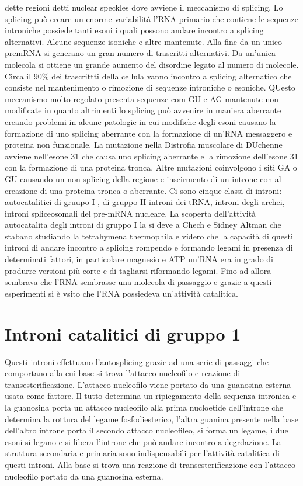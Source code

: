 dette regioni detti nuclear speckles dove avviene il meccanismo di splicing. Lo splicing pu\`o creare un enorme variabilit\`a l'RNA primario che contiene le sequenze introniche possiede
tanti esoni i quali possono andare incontro a splicing alternativi. Alcune sequenze isoniche e altre mantenute. Alla fine da un unico premRNA si generano un gran numero di trascritti
alternativi. Da un'unica molecola si ottiene un grande aumento del disordine legato al numero di molecole. Circa il $90\%$ dei trascrittti della cellula vanno incontro a splicing 
alternatico che consiste nel mantenimento o rimozione di sequenze introniche o esoniche. QUesto meccanismo molto regolato presenta sequenze com GU e AG mantenute non modificate in quanto
altrimenti lo splicing pu\`o avvenire in maniera aberrante creando problemi in alcune patologie in cui modifiche degli esoni causano la formazione di uno splicing aberrante con la 
formazione di un'RNA messaggero e proteina non funzionale. La mutazione nella Distrofia muscolare di DUchenne avviene nell'esone 31 che causa uno splicing aberrante e la rimozione 
dell'esone 31 con la formazione di una proteina tronca. Altre mutazioni coinvolgono i siti GA o GU causando un non splicing della regione e inseirmento di un introne con al creazione
di una proteina tronca o aberrante. Ci sono cinque classi di introni: autocatalitici di gruupo I , di gruppo II introni dei tRNA, introni degli archei, introni spliceosomali del pre-mRNA 
nucleare. La scoperta dell'attivit\`a autocatalita degli introni di gruppo I la si deve a Chech e Sidney Altman che stabano studiando la tetrahymena thermophila e videro che la capacit\`a
di questi introni di andare incontro a splicing rompendo e formando legami in presenza di determinati fattori, in particolare magnesio e ATP un'RNA era in grado di produrre versioni
pi\`u corte e di tagliarsi riformando legami. Fino ad allora sembrava che l'RNA sembrasse una molecola di passaggio e grazie a questi esperimenti si \`e vsito che l'RNA possiedeva 
un'attivit\`a catalitica.
\section{Introni catalitici di gruppo 1}
Questi introni effettuano l'autosplicing grazie ad una serie di passaggi che comportano alla cui base si trova l'attacco nucleofilo e reazione di transesterificazione. L'attacco 
nucleofilo viene portato da una guanosina esterna usata come fattore. Il tutto determina un ripiegamento della sequenza intronica e la guanosina porta un attacco nucleofilo alla prima
nucloetide dell'introne che determina la rottura del legame fosfodiesterico, l'altra guanina presente nella base dell'altro introne porta il secondo attacco nucleofileo, si forma un 
legame, i due esoni si legano e si libera l'introne che pu\`o andare incontro a degrdazione. La struttura secondaria e primaria sono indispensabili per l'attivit\`a catalitica di questi
introni. Alla base si trova una reazione di transesterificazione con l'attacco nucleofilo portato da una guanosina esterna.
